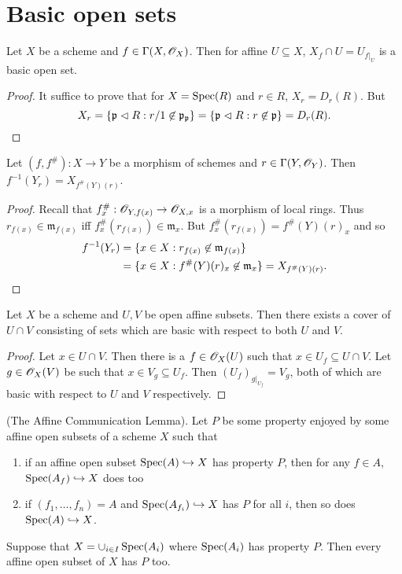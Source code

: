 \documentclass{memoir}
\begin{document}
\section{Basic open sets}
\begin{proposition}
    Let $X$ be a scheme and $f\in \Gamma(X,\mathscr{O}_X)$.
    Then for affine $U\subseteq X$, $X_f\cap U = U_{f|_U}$ is a basic open set.
\end{proposition}
\begin{proof}
    It suffice to prove that for $X=\operatorname{Spec}(R)$ and $r\in R$, $X_r = D_r(R)$.
    But
    \begin{equation}
        X_r = \lbrace\mathfrak p \vartriangleleft R : r/1 \not\in \mathfrak p_{\mathfrak p}\rbrace = \lbrace\mathfrak p \vartriangleleft R : r\not\in \mathfrak p\rbrace = D_r(R).
    \end{equation}
\end{proof}
\begin{proposition}
    Let $(f,f^\#):X\to Y$ be a morphism of schemes and $r\in \Gamma(Y,\mathscr{O}_Y)$.
    Then $f^{-1}(Y_r) = X_{f^\#(Y)(r)}$.
\end{proposition}
\begin{proof}
    Recall that $f^\#_x:\mathscr{O}_{Y,f(x)}\to \mathscr{O}_{X,x}$ is a morphism of local rings.
    Thus $r_{f(x)}\in \mathfrak m_{f(x)}$ iff $f^\#_x(r_{f(x)}) \in \mathfrak m_x$.
    But $f^\#_x(r_{f(x)}) = f^\#(Y)(r)_x$ and so
    \begin{align}
        f^{-1}(Y_r) &= \lbrace x\in X: r_{f(x)} \not\in \mathfrak m_{f(x)}\rbrace \nonumber \\
                    &= \lbrace x\in X: f^\#(Y)(r)_x \not\in \mathfrak m_x\rbrace = X_{f^\#(Y)(r)}.
    \end{align}
\end{proof}
\begin{proposition}
    Let $X$ be a scheme and $U,V$ be open affine subsets.
    Then there exists a cover of $U\cap V$ consisting of sets which are basic with respect to both $U$ and $V$.
\end{proposition}
\begin{proof}
    Let $x\in U\cap V$.
    Then there is a $f\in \mathscr{O}_X(U)$ such that $x\in U_f\subseteq U\cap V$.
    Let $g\in \mathscr{O}_X(V)$ be such that $x\in V_g\subseteq U_f$.
    Then $(U_f)_{g|_{U_f}} = V_g$, both of which are basic with respect to $U$ and $V$ respectively.
\end{proof}
\begin{lemma}
    (The Affine Communication Lemma).
    Let $P$ be some property enjoyed by some affine open subsets of a scheme $X$ such that
    \begin{enumerate}
        \item if an affine open subset $\operatorname{Spec}(A)\hookrightarrow X$ has property $P$, then for any $f\in A$, $\operatorname{Spec}(A_f)\hookrightarrow X$ does too
        \item if $(f_1,\dots,f_n) = A$ and $\operatorname{Spec}(A_{f_i})\hookrightarrow X$ has $P$ for all $i$, then so does $\operatorname{Spec}(A)\hookrightarrow X$.
    \end{enumerate}
    Suppose that $X = \cup_{i\in I}\operatorname{Spec}(A_i)$ where $\operatorname{Spec}(A_i)$ has property $P$. 
    Then every affine open subset of $X$ has $P$ too.
\end{lemma}
\end{document}
